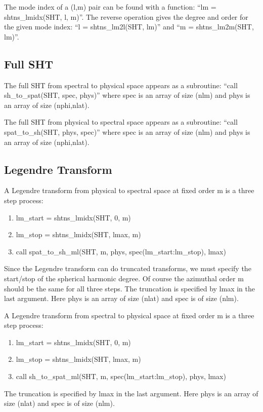 \documentclass[10pt,letterpaper]{article}
\begin{document}
The mode index of a (l,m) pair can be found with a function:
``lm = shtns\_lmidx(SHT, l, m)''. The reverse operation gives the degree and order for
the given mode index: ``l = shtns\_lm2l(SHT, lm)'' and ``m = shtns\_lm2m(SHT, lm)''.

\subsection{Full SHT}
The full SHT from spectral to physical space appears as a subroutine:
``call sh\_to\_spat(SHT, spec, phys)'' where spec is an array of size (nlm) and
phys is an array of size (nphi,nlat).

The full SHT from physical to spectral space appears as a subroutine:
``call spat\_to\_sh(SHT, phys, spec)'' where spec is an array of size (nlm) and
phys is an array of size (nphi,nlat).

\subsection{Legendre Transform}
A Legendre transform from physical to spectral space at fixed order m is a three
step process:
\begin{enumerate}
  \item lm\_start = shtns\_lmidx(SHT, 0, m)
  \item lm\_stop = shtns\_lmidx(SHT, lmax, m)
  \item call spat\_to\_sh\_ml(SHT, m, phys, spec(lm\_start:lm\_stop), lmax)
\end{enumerate}
Since the Legendre transform can do truncated transforms, we must specify the start/stop
of the spherical harmonic degree. Of course the azimuthal order m should be the same
for all three steps. The truncation is specified by lmax in the last argument. Here
phys is an array of size (nlat) and spec is of size (nlm).

A Legendre transform from spectral to physical space at fixed order m is a three
step process:
\begin{enumerate}
  \item lm\_start = shtns\_lmidx(SHT, 0, m)
  \item lm\_stop = shtns\_lmidx(SHT, lmax, m)
  \item call sh\_to\_spat\_ml(SHT, m, spec(lm\_start:lm\_stop), phys, lmax)
\end{enumerate}
The truncation is specified by lmax in the last argument. Here
phys is an array of size (nlat) and spec is of size (nlm).
\end{document}
